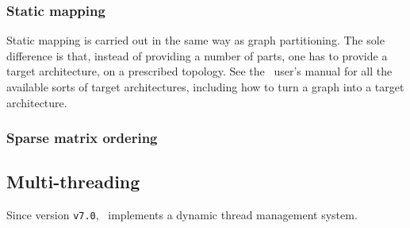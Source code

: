 \subsubsection{Static mapping}

Static mapping is carried out in the same way as graph
partitioning. The sole difference is that, instead of providing a
number of parts, one has to provide a target architecture, on a
prescribed topology. See the \scotch\ user's manual for all the
available sorts of target architectures, including how to turn a graph
into a target architecture.

\subsubsection{Sparse matrix ordering}

\subsection{Multi-threading}

Since version \texttt{v7.0}, \scotch\ implements a dynamic thread
management system.

\begin{center}
\end{center}
